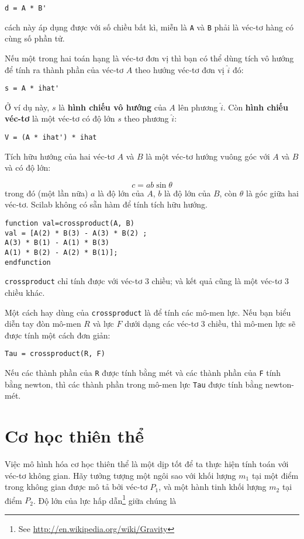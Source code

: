 \documentclass[12pt]{book}
\begin{document}
\begin{verbatim}
d = A * B'
\end{verbatim}
%
cách này áp dụng được với số chiều bất kì, miễn là {\tt A} và {\tt B} phải là
véc-tơ hàng có cùng số phần tử.

Nếu một trong hai toán hạng là véc-tơ đơn vị thì bạn có thể dùng tích 
vô hướng để tính ra thành phần của véc-tơ $A$ theo hướng véc-tơ đơn vị 
$\hat{i}$ đó:

\begin{verbatim}
s = A * ihat'
\end{verbatim}
%
Ở ví dụ này, $s$ là {\bf hình chiếu vô hướng} của $A$
lên phương $\hat{i}$. Còn {\bf hình chiếu véc-tơ} là một véc-tơ 
có độ lớn $s$ theo phương $\hat{i}$:

\begin{verbatim}
V = (A * ihat') * ihat
\end{verbatim}
%
Tích hữu hướng của hai véc-tơ $A$ và $B$ là một véc-tơ hướng 
vuông góc với $A$ và $B$ và có độ lớn:

\[ c = a b \sin \theta \]
%
trong đó (một lần nữa) $a$ là độ lớn của $A$, $b$ là độ lớn của 
$B$, còn $\theta$ là góc giữa hai véc-tơ.  Scilab không có sẵn hàm 
để tính tích hữu hướng.

\begin{verbatim}
function val=crossproduct(A, B)
val = [A(2) * B(3) - A(3) * B(2) ; 
A(3) * B(1) - A(1) * B(3)
A(1) * B(2) - A(2) * B(1)];
endfunction
\end{verbatim}
%
{\tt crossproduct} chỉ tính được với véc-tơ 3 chiều; và kết quả cũng là một 
véc-tơ 3 chiều khác.

Một cách hay dùng của {\tt crossproduct} là để tính các mô-men lực. Nếu bạn 
biểu diễn tay đòn mô-men $R$ và lực $F$ dưới dạng các véc-tơ 3
chiều, thì mô-men lực sẽ được tính một cách đơn giản:

\begin{verbatim}
Tau = crossproduct(R, F)
\end{verbatim}

Nếu các thành phần của {\tt R} được tính bằng mét và các thành 
phần của {\tt F} tính bằng newton, thì các thành phần trong mô-men lực 
{\tt Tau} được tính bằng newton-mét.



\section{Cơ học thiên thể}

Việc mô hình hóa cơ học thiên thể là một dịp tốt để ta thực hiện tính 
toán với véc-tơ không gian. Hãy tưởng tượng một ngôi sao với 
khối lượng $m_1$ tại một điểm trong không gian được mô tả bởi 
véc-tơ $P_1$, và một hành tinh khối lượng $m_2$ tại điểm $P_2$.  
Độ lớn của lực hấp dẫn\footnote{See
\url{http://en.wikipedia.org/wiki/Gravity}} giữa chúng là 
\end{document}
